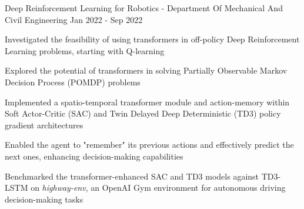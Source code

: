 \begin{cventries}
    \cventry
    {Deep Reinforcement Learning for Robotics - Department Of Mechanical And Civil Engineering}
    {}
    {}
    {Jan 2022 - Sep 2022}
    {\begin{cvitems}
            \item {Investigated the feasibility of using transformers in off-policy Deep Reinforcement Learning problems, starting with Q-learning}
            \item {Explored the potential of transformers in solving Partially Observable Markov Decision Process (POMDP) problems}
            \item {Implemented a spatio-temporal transformer module and action-memory within Soft Actor-Critic (SAC) and Twin Delayed Deep Deterministic (TD3) policy gradient architectures}
            \item {Enabled the agent to "remember" its previous actions and effectively predict the next ones, enhancing decision-making capabilities}
            \item {Benchmarked the transformer-enhanced SAC and TD3 models against TD3-LSTM on \emph{highway-env}, an OpenAI Gym environment for autonomous driving decision-making tasks}
        \end{cvitems}}
\end{cventries}